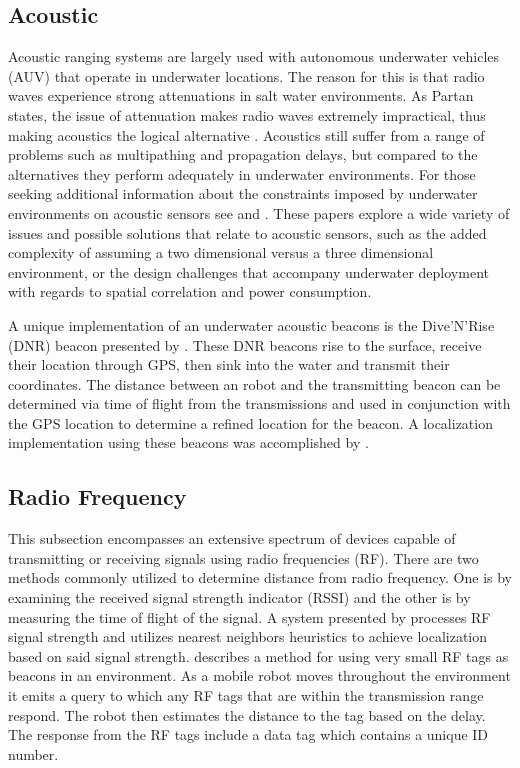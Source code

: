 \documentclass[conference]{IEEEtran}
\begin{document}
		
		\subsection{Acoustic}
	
			Acoustic ranging systems are largely used with autonomous underwater vehicles (AUV) that operate in underwater locations. The reason for this is that radio waves experience strong attenuations in salt water environments. As Partan states, the issue of attenuation makes radio waves extremely impractical, thus making acoustics the logical alternative \cite{Partan2007}. Acoustics still suffer from a range of problems such as multipathing and propagation delays, but compared to the alternatives they perform adequately in underwater environments. For those seeking additional information about the constraints imposed by underwater environments on acoustic sensors see \cite{Erol-Kantarci2011} and \cite{Akyildiz2005}. These papers explore a wide variety of issues and possible solutions that relate to acoustic sensors, such as the added complexity of assuming a two dimensional versus a three dimensional environment, or the design challenges that accompany underwater deployment with regards to spatial correlation and power consumption. 
		  	
		  	
			A unique implementation of an underwater acoustic beacons is the Dive'N'Rise (DNR) beacon presented by \cite{Erol2007}. These DNR beacons rise to the surface, receive their location through GPS, then sink into the water and transmit their coordinates. The distance between an robot and the transmitting beacon can be determined via time of flight from the transmissions and used in conjunction with the GPS location to determine a refined location for the beacon. A localization implementation using these beacons was accomplished by \cite{Erol2008}. 
	

		\subsection{Radio Frequency}
			
			This subsection encompasses an extensive spectrum of devices capable of transmitting or receiving signals using radio frequencies (RF). There are two methods commonly utilized to determine distance from radio frequency. One is by examining the received signal strength indicator (RSSI) and the other is by measuring the time of flight of the signal. A system presented by \cite{Padmanabhan2000} processes RF signal strength and utilizes nearest neighbors heuristics to achieve localization based on said signal strength.  \cite{Kurth2003a} describes a method for using very small RF tags as beacons in an environment.  As a mobile robot moves throughout the environment it emits a query to which any RF tags that are within the transmission range respond. The robot then estimates the distance to the tag based on the delay. The response from the RF tags include a data tag which contains a unique ID number. 
						
\end{document}
